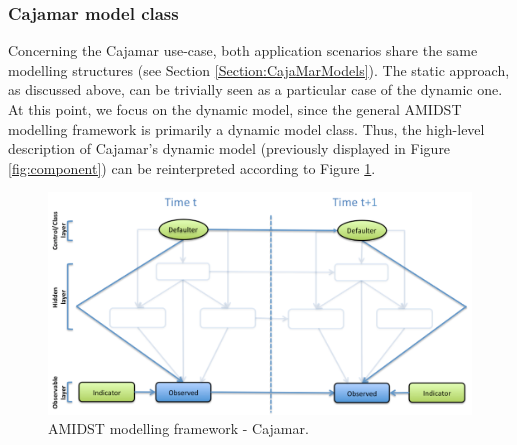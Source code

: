 \subsubsection{Cajamar model class}\label{cajamarAMIDSTModels}

Concerning the Cajamar use-case, both application scenarios share the same modelling structures (see Section \ref{Section:CajaMarModels}). The static approach, as discussed above, can be trivially seen as a particular case of the dynamic one. At this point, we focus on the dynamic model, since the general AMIDST modelling framework is primarily a dynamic model class. Thus, the high-level description of Cajamar's dynamic model (previously displayed in Figure \ref{fig:component}) can be reinterpreted according  to Figure \ref{Figure:AMIDSTModelClassCajamar}. 

\begin{figure}[ht!]
\begin{center}
\includegraphics[scale=0.39]{./figures/AMIDSTModelClassCajamar.png}
\caption{\label{Figure:AMIDSTModelClassCajamar} AMIDST modelling framework - Cajamar.}
\end{center}
\end{figure}


